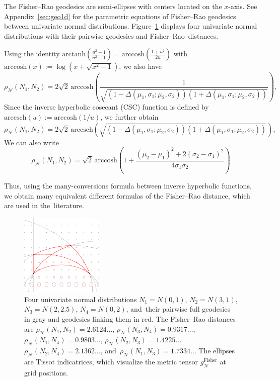 \documentclass[entropy,article,accept,oneauthor,pdftex,entropy]{Definitions/mdpi}
\def\arccsch{\mathrm{arccsch}}
\def\arccosh{\mathrm{arccosh}}
\def\arctanh{\mathrm{arctanh}}
\def\Fisher{\mathrm{Fisher}}
\def\calN{\mathcal{N}}
\begin{document}
\begin{itemize}
The Fisher–Rao geodesics are semi-ellipses with centers located on the $x$-axis.
See Appendix~\ref{sec:geo1d} for the parametric equations of Fisher–Rao geodesics between univariate normal distributions.
Figure~\ref{fig:normal1d} displays four univariate normal distributions with their pairwise geodesics and Fisher–Rao~distances.


Using the identity $\arctanh\left(\frac{u^2-1}{u^2+1}\right)=\arccosh\left(\frac{1+u^2}{2u}\right)$ with 
$\arccosh(x):=\log(x+\sqrt{x^2-1})$, we also have
$$
\rho_{\calN}(N_1,N_2)=2\sqrt{2}\,\arccosh\left(\frac{1}{\sqrt{(1-\Delta(\mu_1,\sigma_1;\mu_2,\sigma_2))(1+\Delta(\mu_1,\sigma_1;\mu_2,\sigma_2))}}\right),
$$
Since the inverse hyperbolic cosecant (CSC) function is defined by $\arccsch(u):=\arccosh(1/u)$, we further obtain
$$
\rho_{\calN}(N_1,N_2)= 2\sqrt{2}\,\arccsch\left(\sqrt{(1-\Delta(\mu_1,\sigma_1;\mu_2,\sigma_2))(1+\Delta(\mu_1,\sigma_1;\mu_2,\sigma_2))}\right),
$$
We can also write
$$
\rho_{\calN}(N_1,N_2)=\sqrt{2}\,\arccosh\left(1+\frac{(\mu_2-\mu_1)^2+2(\sigma_2-\sigma_1)^2}{4\sigma_1\sigma_2}\right)
$$

Thus, using the many-conversions formula between inverse hyperbolic functions, we obtain many equivalent different formulas of the Fisher--Rao distance, which are used in the~literature.



\begin{figure}[H]

\includegraphics[width=0.35\textwidth]{Fig-Example4normals.png}
%
\caption{Four univariate normal distributions 
$N_1=N(0,1)$, $N_2=N(3,1)$, $N_3=N(2,2.5)$, $N_4=N(0,2)$, and~their pairwise full geodesics in gray and geodesics linking them in red.
The Fisher--Rao distances {are} %
 $\rho_\calN(N_1,N_2)=2.6124\ldots$, $\rho_\calN(N_3,N_4)=0.9317\ldots$,
$\rho_\calN(N_1,N_4)=0.9803\ldots$, $\rho_\calN(N_2,N_3)=1.4225\ldots$
$\rho_\calN(N_2,N_4)=2.1362\ldots$, and~$\rho_\calN(N_1,N_3)=1.7334\ldots$
The ellipses are Tissot indicatrices, which visualize the metric tensor $g_\calN^\Fisher$ at grid positions.
 \label{fig:normal1d}}
\end{figure}







\end{itemize}
\end{document}
